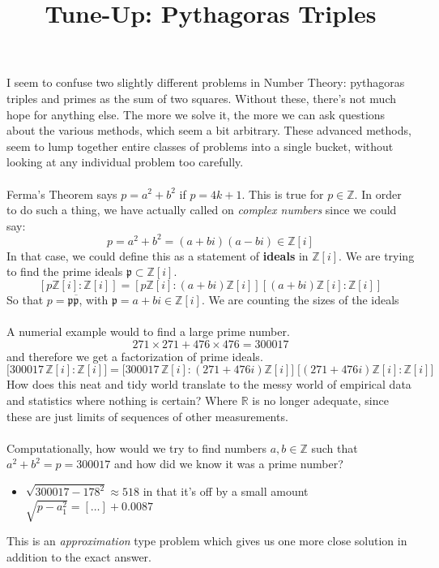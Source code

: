 \documentclass[12pt]{article}
\title{Tune-Up: Pythagoras Triples}
\date{}
\begin{document}
\sffamily

\maketitle

I seem to confuse two slightly different problems in Number Theory: pythagoras triples and primes as the sum of two squares.  Without these, there's not much hope for anything else.   The more we solve it, the more we can ask questions about the various methods, which seem a bit arbitrary.  These advanced methods, seem to lump together entire classes of problems into a single bucket, without looking at any individual problem too carefully. \\ \\
Ferma's Theorem says $p = a^2 + b^2$ if $p = 4k+1$.  This is true for $p \in \mathbb{Z}$.  In order to do such a thing, we have actually called on \textit{complex numbers} since we could say:
$$ p = a^2 + b^2 = (a+bi)(a-bi) \in \mathbb{Z}[i] $$ 
In that case, we could define this as a statement of \textbf{ideals} in $\mathbb{Z}[i]$.  We are trying to find the prime ideals $\mathfrak{p} \subset \mathbb{Z}[i]$.  
$$ [ p \mathbb{Z}[i]: \mathbb{Z}[i]]  = [ p \mathbb{Z}[i] : (a + bi)\mathbb{Z}[i]] [(a + bi)\mathbb{Z}[i] : \mathbb{Z}[i]]$$
So that $p = \mathfrak{p}\overline{\mathfrak{p}}$, with $\mathfrak{p} = a + bi \in \mathbb{Z}[i]$. We are counting the sizes of the ideals\\ \\
A numerial example would to find a large prime number.   
$$ 271 \times 271 + 476 \times 476 = 300017 $$ 
and therefore we get a factorization of prime ideals.
$$ \big[ 300017 \, \mathbb{Z}[i] : \mathbb{Z}[i]\big]
 = \big[ 300017 \, \mathbb{Z}[i] : (271 + 476i)\mathbb{Z}[i]\big] \;
 \big[ (271 + 476i) \mathbb{Z}[i] : \mathbb{Z}[i] \big]$$
How does this neat and tidy world translate to the messy world of empirical data and statistics where nothing is certain?  Where $\mathbb{R}$ is no longer adequate, since these are just limits of sequences of other measurements. \\ \\
Computationally, how would we try to find numbers $a, b \in \mathbb{Z}$ such that $a^2 + b^2 = p = 300017$ and how did we know it was a prime number? 
\begin{itemize}
\item $\sqrt{300017 - 178^2} \approx 518 $ in that it's off by a small amount  $\sqrt{p - a_1^2} = [\dots]   + 0.0087$
\end{itemize}
This is an \textit{approximation} type problem which gives us one more close solution in addition to the exact answer. 
\end{document}
